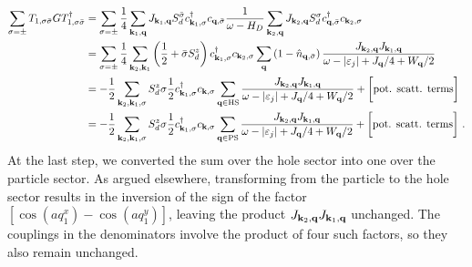 \documentclass{revtex4-2}
\begin{document}
\begin{equation}\begin{aligned}\label{t1t1h}
	\sum_{\sigma=\pm}T_{1,\sigma\bar\sigma} G T^\dagger_{1,\sigma\bar\sigma} &= \sum_{\sigma=\pm}\frac{1}{4} \sum_{{\bf k}_1,{\bf q}}J_{{\bf k}_1,{\bf q}} S_d^{\bar\sigma} c^\dagger_{{\bf k}_1,\sigma} c_{{\bf q},\bar\sigma} \frac{1}{\omega - H_D}\sum_{{\bf k}_2,{\bf q}}J_{{\bf k}_2,{\bf q}} S_d^\sigma c^\dagger_{{\bf q},\bar\sigma} c_{{\bf k}_2,\sigma}\\
										 &= \sum_{\sigma=\pm}\frac{1}{4}\sum_{{\bf k}_2,{\bf k}_1} \left(\frac{1}{2} + \bar\sigma S_d^z\right) c^\dagger_{{\bf k}_1,\sigma} c_{{\bf k}_2,\sigma} \sum_{{\bf q}} \left(1 - \hat n_{{\bf q},\bar\sigma}\right) \frac{J_{{\bf k}_2,{\bf q}} J_{{\bf k}_1,{\bf q}}}{\omega - |\varepsilon_j| + J_{{\bf q}}/4 + W_{{\bf q}}/2}\\
										 &= -\frac{1}{2}\sum_{{\bf k}_2,{\bf k}_1, \sigma} S_d^z \sigma \frac{1}{2}c^\dagger_{{\bf k}_1,\sigma}c_{{\bf k},\sigma} \sum_{{\bf q} \in \text{HS}} \frac{J_{{\bf k}_2,{\bf q}} J_{{\bf k}_1,{\bf q}}}{\omega - |\varepsilon_j| + J_{{\bf q}}/4 + W_{{\bf q}}/2} + \bigg[\text{pot. scatt. terms}\bigg]\\
										 &= -\frac{1}{2}\sum_{{\bf k}_2,{\bf k}_1, \sigma} S_d^z \sigma \frac{1}{2}c^\dagger_{{\bf k}_1,\sigma}c_{{\bf k},\sigma} \sum_{{\bf q} \in \text{PS}} \frac{J_{{\bf k}_2,{\bf q}} J_{{\bf k}_1,{\bf q}}}{\omega - |\varepsilon_j| + J_{{\bf q}}/4 + W_{{\bf q}}/2} + \bigg[\text{pot. scatt. terms}\bigg]~.
\end{aligned}\end{equation}
At the last step, we converted the sum over the hole sector into one over the particle sector. As argued elsewhere, transforming from the particle to the hole sector results in the inversion of the sign of the factor \(\left[\cos\left( aq_1^x \right) - \cos\left( aq_1^y \right) \right]\), leaving the product \(J_{{\bf k}_2,{\bf q}} J_{{\bf k}_1,{\bf q}}\) unchanged. The couplings in the denominators involve the product of four such factors, so they also remain unchanged.
\end{document}

